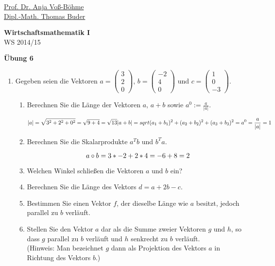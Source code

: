 \documentclass[12pt,a4paper]{scrreprt}
\begin{document}
\begin{flushleft}
\href{mailto:anja.voss-boehme@htw-dresden.de}{Prof. Dr. Anja Voß-Böhme} \\
\href{mailto:buder@htw-dresden.de}{Dipl.-Math. Thomas Buder}
\end{flushleft}

\begin{center}
\large{\textbf{ Wirtschaftsmathematik I}} \\
WS 2014/15 \end{center}

\begin{center}\large{\textbf{ Übung 6 }} \end{center}

\bigskip
\begin{enumerate}
	\item	Gegeben seien die Vektoren %
		$a=\begin{pmatrix}
			3 \\
			2\\
			0
		\end{pmatrix}$,
		$b=\begin{pmatrix}
			-2 \\
			4 \\
			0
		\end{pmatrix}$ und
		$c=\begin{pmatrix}
			1 \\
			0 \\
			-3
		\end{pmatrix}.$
	\begin{enumerate}
		\item Berechnen Sie die Länge der Vektoren $a$, $a+b$ sowie $a^0:=\frac{a}{|a|}$.

		\[
			|a| = \sqrt{3^2+2^2+0^2} = \sqrt{9+4} = \sqrt{13} \\
			|a+b| = sqrt{(a_1+b_1)^2+(a_2+b_2)^2+(a_3+b_3)^2} = \\
			a^0 = \frac{a}{|a|} = 1 \\
		\]

	\item Berechnen Sie die Skalarprodukte $a^Tb$ und $b^Ta$.

		\[
a \circ b = 3*-2+2*4 = -6+8 = 2 \\
		\]

	\item Welchen Winkel schließen die Vektoren $a$ und $b$
 ein?
	\item Berechnen Sie die Länge des Vektors $d=a+2b-c.$
	\item Bestimmen Sie einen Vektor $f$, der dieselbe Länge wie $a$ besitzt, jedoch parallel zu $b$ verläuft.
	\item Stellen Sie den Vektor $a$ dar als die Summe zweier Vektoren $g$ und $h$, so dass $g$ parallel zu $b$ verläuft und $h$ senkrecht zu $b$ verläuft. \\
(Hinweis: Man bezeichnet $g$ dann als Projektion des Vektors $a$ in Richtung des Vektors $b$.)


\end{enumerate}
\end{enumerate}
\end{document}

